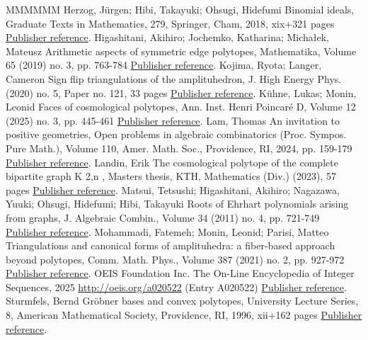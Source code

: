 \begin{thebibliography}{MMMMMM}
 Herzog, Jürgen; Hibi, Takayuki; Ohsugi, Hidefumi Binomial ideals, Graduate Texts in Mathematics, 279, Springer, Cham, 2018, xix+321 pages \href{https://alco.centre-mersenne.org/articles/10.5802/alco.430/#binomial}{Publisher reference}.
 Higashitani, Akihiro; Jochemko, Katharina; Michałek, Mateusz Arithmetic aspects of symmetric edge polytopes, Mathematika, Volume 65 (2019) no. 3, pp. 763-784 \href{https://alco.centre-mersenne.org/articles/10.5802/alco.430/#HJM}{Publisher reference}.
 Kojima, Ryota; Langer, Cameron Sign flip triangulations of the amplituhedron, J. High Energy Phys. (2020) no. 5, Paper no. 121, 33 pages \href{https://alco.centre-mersenne.org/articles/10.5802/alco.430/#kojima2020sign}{Publisher reference}.
 Kühne, Lukas; Monin, Leonid Faces of cosmological polytopes, Ann. Inst. Henri Poincaré D, Volume 12 (2025) no. 3, pp. 445-461 \href{https://alco.centre-mersenne.org/articles/10.5802/alco.430/#kuhne2022faces}{Publisher reference}.
 Lam, Thomas An invitation to positive geometries, Open problems in algebraic combinatorics (Proc. Sympos. Pure Math.), Volume 110, Amer. Math. Soc., Providence, RI, 2024, pp. 159-179 \href{https://alco.centre-mersenne.org/articles/10.5802/alco.430/#lam2022invitation}{Publisher reference}.
 Landin, Erik The cosmological polytope of the complete bipartite graph K 2,n , Masters thesis, KTH, Mathematics (Div.) (2023), 57 pages \href{https://alco.centre-mersenne.org/articles/10.5802/alco.430/#landin2023cosmological}{Publisher reference}.
 Matsui, Tetsushi; Higashitani, Akihiro; Nagazawa, Yuuki; Ohsugi, Hidefumi; Hibi, Takayuki Roots of Ehrhart polynomials arising from graphs, J. Algebraic Combin., Volume 34 (2011) no. 4, pp. 721-749 \href{https://alco.centre-mersenne.org/articles/10.5802/alco.430/#FirstSEP}{Publisher reference}.
 Mohammadi, Fatemeh; Monin, Leonid; Parisi, Matteo Triangulations and canonical forms of amplituhedra: a fiber-based approach beyond polytopes, Comm. Math. Phys., Volume 387 (2021) no. 2, pp. 927-972 \href{https://alco.centre-mersenne.org/articles/10.5802/alco.430/#mohammadi2021triangulations}{Publisher reference}.
 OEIS Foundation Inc. The On-Line Encyclopedia of Integer Sequences, 2025 \url{http://oeis.org/a020522} (Entry A020522) \href{https://alco.centre-mersenne.org/articles/10.5802/alco.430/#OEIS}{Publisher reference}.
 Sturmfels, Bernd Gröbner bases and convex polytopes, University Lecture Series, 8, American Mathematical Society, Providence, RI, 1996, xii+162 pages \href{https://alco.centre-mersenne.org/articles/10.5802/alco.430/#sturmfels1996grobner}{Publisher reference}.
\end{thebibliography}
